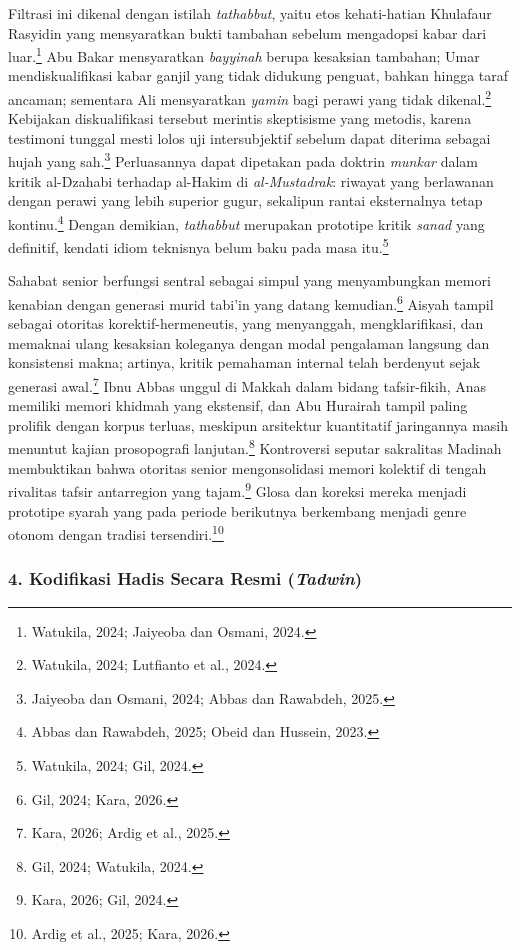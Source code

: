Filtrasi ini dikenal dengan istilah \textit{tathabbut}, yaitu etos kehati-hatian Khulafaur Rasyidin yang mensyaratkan bukti tambahan sebelum mengadopsi kabar dari luar.\footnote{Watukila, 2024; Jaiyeoba dan Osmani, 2024.} Abu Bakar mensyaratkan \textit{bayyinah} berupa kesaksian tambahan; Umar mendiskualifikasi kabar ganjil yang tidak didukung penguat, bahkan hingga taraf ancaman; sementara Ali mensyaratkan \textit{yamin} bagi perawi yang tidak dikenal.\footnote{Watukila, 2024; Lutfianto et al., 2024.} Kebijakan diskualifikasi tersebut merintis skeptisisme yang metodis, karena testimoni tunggal mesti lolos uji intersubjektif sebelum dapat diterima sebagai hujah yang sah.\footnote{Jaiyeoba dan Osmani, 2024; Abbas dan Rawabdeh, 2025.} Perluasannya dapat dipetakan pada doktrin \textit{munkar} dalam kritik al-Dzahabi terhadap al-Hakim di \textit{al-Mustadrak}: riwayat yang berlawanan dengan perawi yang lebih superior gugur, sekalipun rantai eksternalnya tetap kontinu.\footnote{Abbas dan Rawabdeh, 2025; Obeid dan Hussein, 2023.} Dengan demikian, \textit{tathabbut} merupakan prototipe kritik \textit{sanad} yang definitif, kendati idiom teknisnya belum baku pada masa itu.\footnote{Watukila, 2024; Gil, 2024.}

Sahabat senior berfungsi sentral sebagai simpul yang menyambungkan memori kenabian dengan generasi murid tabi'in yang datang kemudian.\footnote{Gil, 2024; Kara, 2026.} Aisyah tampil sebagai otoritas korektif-hermeneutis, yang menyanggah, mengklarifikasi, dan memaknai ulang kesaksian koleganya dengan modal pengalaman langsung dan konsistensi makna; artinya, kritik pemahaman internal telah berdenyut sejak generasi awal.\footnote{Kara, 2026; Ardig et al., 2025.} Ibnu Abbas unggul di Makkah dalam bidang tafsir-fikih, Anas memiliki memori khidmah yang ekstensif, dan Abu Hurairah tampil paling prolifik dengan korpus terluas, meskipun arsitektur kuantitatif jaringannya masih menuntut kajian prosopografi lanjutan.\footnote{Gil, 2024; Watukila, 2024.} Kontroversi seputar sakralitas Madinah membuktikan bahwa otoritas senior mengonsolidasi memori kolektif di tengah rivalitas tafsir antarregion yang tajam.\footnote{Kara, 2026; Gil, 2024.} Glosa dan koreksi mereka menjadi prototipe syarah yang pada periode berikutnya berkembang menjadi genre otonom dengan tradisi tersendiri.\footnote{Ardig et al., 2025; Kara, 2026.}

\subsubsection*{4. Kodifikasi Hadis Secara Resmi (\textit{Tadwin})}

